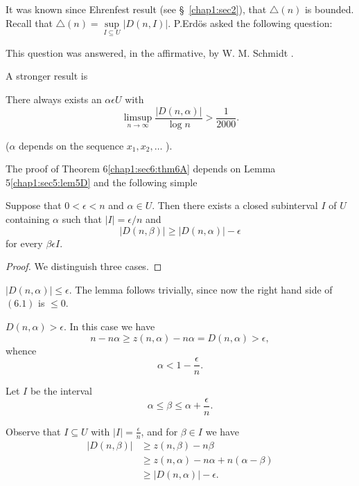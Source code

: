 It was known since Ehrenfest result (see \S\ \ref{chap1:sec2}), that $\triangle(n)$ is bounded. Recall that $\triangle(n) = \sup\limits_{I \subseteq U} |D(n, I)|$. P.Erd\"os \cite{5} asked the following question:

\medskip
{}

This question was answered, in the affirmative, by W. M. Schmidt \cite{21}.

A stronger result is
\begin{theorem}\label{chap1:sec6:thm6A}
There always exists an $\alpha \epsilon U$ with
$$
\mathop{\lim \sup}_{n \to \infty} \frac{|D(n, \alpha)|}{\log n} > \frac{1}{2000}.
$$
\end{theorem}

($\alpha$ depends on the sequence $x_{1}, x_{2}, \ldots$ ).

The proof of Theorem 6\ref{chap1:sec6:thm6A} depends on Lemma 5\ref{chap1:sec5:lem5D} and the following simple

\begin{lemma}\label{chap1:sec6:lem6B}
Suppose that $0 < \epsilon < n$ and $\alpha \in U$. Then there exists a closed subinterval $I$ of $U$ containing $\alpha$ such that $|I| = \epsilon/n$ and 
\begin{equation*}
|D(n, \beta)| \geq |D(n, \alpha)| - \epsilon\tag{6.1}\label{chap1:sec6:eq6.1}
\end{equation*}
for every $\beta \epsilon I$.
\end{lemma}\pageoriginale

\begin{proof}
 We distinguish three cases.
 \end{proof}


 $|D(n, \alpha)| \leq \epsilon$. The lemma follows trivially, since now the right hand side of $(6.1)$ is $\leq 0$.

\medskip
{} $D(n, \alpha)> \epsilon$. In this case we have
$$
n - n\alpha \geq z(n, \alpha) - n\alpha = D(n, \alpha) > \epsilon,
$$
whence
$$
\alpha < 1 - \frac{\epsilon}{n}.
$$

Let $I$ be the interval
$$
\alpha \leq \beta \leq \alpha + \frac{\epsilon}{n}.
$$

Observe that $I \subseteq U$ with $|I| = \frac{\epsilon}{n}$, and for $\beta \in I$ we have
\begin{align*}
|D(n, \beta)| & \geq z(n, \beta) - n\beta\\
& \geq z(n, \alpha) -n\alpha + n(\alpha - \beta)\\
& \geq |D(n, \alpha)| - \epsilon.
\end{align*}

